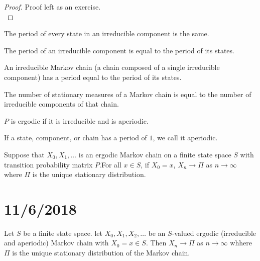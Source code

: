 \documentclass[english, course]{Notes}
\begin{document}
\begin{proof}
Proof left as an exercise.\\
\end{proof}

\begin{corollary}
The period of every state in an irreducible component is the same.\\
\end{corollary}

\begin{definition}
The period of an irreducible component is equal to the period of its states.\\
\end{definition}

\begin{definition}
An irreducible Markov chain (a chain composed of a single irreducible component) has a period equal to the period of its states.\\
\end{definition}

\begin{fact}
The number of stationary measures of a Markov chain is equal to the number of irreducible components of that chain.\\
\end{fact}

\begin{definition}
$P$ is ergodic if it is irreducible and is aperiodic.\\
\end{definition}

\begin{definition}
If a state, component, or chain has a period of $1$, we call it aperiodic.\\
\end{definition}

\begin{theorem}
Suppose that $X_0, X_1, \dots$ is an ergodic Markov chain on a finite state space $S$ with transition probability matrix $P$.For all $x \in S$, if $X_0 = x$, $X_n \to \Pi$ as $n \to \infty$ where $\Pi$ is the unique stationary distribution.
\end{theorem}

\section{11/6/2018}

\begin{theorem}
	Let $S$ be a finite state space. let $X_0, X_1, X_2, \dots$ be an $S$-valued ergodic (irreducible and aperiodic) Markov chain with $X_0 = x \in S$. Then $X_n \to \Pi$ as $n \to \infty$ whhere $\Pi$ is the unique stationary distribution of the Markov chain.
\end{theorem}
\end{document}
